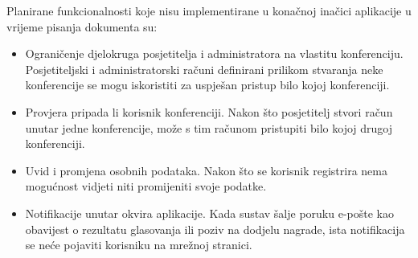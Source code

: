 		 Planirane funkcionalnosti koje nisu implementirane u konačnoj inačici aplikacije u vrijeme pisanja dokumenta su:
		 \begin{itemize}
		 	\item Ograničenje djelokruga posjetitelja i administratora na vlastitu konferenciju. Posjetiteljski i administratorski računi definirani prilikom stvaranja neke konferencije se mogu iskoristiti za uspješan pristup bilo kojoj konferenciji.
		 	\item Provjera pripada li korisnik konferenciji. Nakon što posjetitelj stvori račun unutar jedne konferencije, može s tim računom pristupiti bilo kojoj drugoj konferenciji.
		 	\item Uvid i promjena osobnih podataka. Nakon što se korisnik registrira nema mogućnost vidjeti niti promijeniti svoje podatke.
		 	\item Notifikacije unutar okvira aplikacije. Kada sustav šalje poruku e-pošte kao obavijest o rezultatu glasovanja ili poziv na dodjelu nagrade, ista notifikacija se neće pojaviti korisniku na mrežnoj stranici.
		 \end{itemize}
		
		\eject 